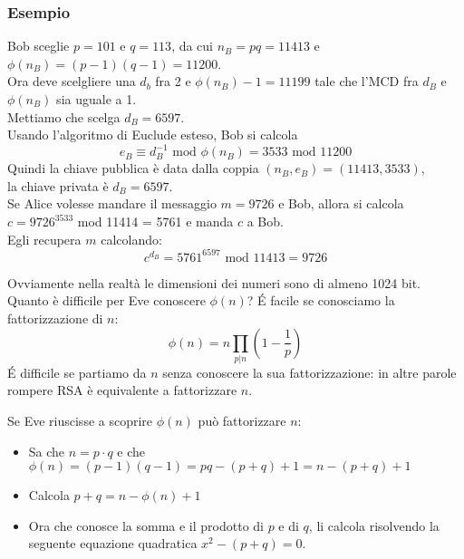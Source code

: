 \subsubsection*{Esempio}
Bob sceglie $p=101$ e $q=113$, da cui $n_B=pq=11413$ e $\phi(n_B) = (p-1)(q-1) = 11200$.\\
Ora deve scelgliere una $d_b$ fra 2 e $\phi(n_B) - 1 =11199$ tale che l'MCD fra $d_B$ e $\phi(n_B)$ sia uguale a 1.\\
Mettiamo che scelga $d_B=6597$.\\
Usando l'algoritmo di Euclude esteso, Bob si calcola
\begin{equation*}
	e_B \equiv d_B^{-1} \text{ mod } \phi(n_B) = 3533 \text { mod } 11200
\end{equation*}
Quindi la chiave pubblica è data dalla coppia $(n_B, e_B) = (11413, 3533)$,\\
la chiave privata è $d_B=6597$.\\

Se Alice volesse mandare il messaggio $m=9726$ e Bob, allora si calcola $c=9726^{3533}$ mod 11414 = 5761 e manda $c$ a Bob.\\
Egli recupera $m$ calcolando:
\begin{equation*}
	c^{d_B} = 5761^{6597} \text{ mod } 11413 = 9726
\end{equation*}

Ovviamente nella realtà le dimensioni dei numeri sono di almeno 1024 bit.\\


Quanto è difficile per Eve conoscere $\phi(n)$? \'E facile se conosciamo la fattorizzazione di $n$:
\begin{equation*}
	\phi(n) = n \prod_{p|n}(1 - \frac1p)
\end{equation*}
\'E difficile se partiamo da $n$ senza conoscere la sua fattorizzazione: in altre parole rompere RSA è equivalente a fattorizzare $n$.

Se Eve riuscisse a scoprire $\phi(n)$ può fattorizzare $n$:
\begin{itemize}
	\item Sa che $n=p\cdot q$ e che $\phi(n) = (p-1)(q-1) = pq - (p+q)+1=n-(p+q)+1$
	\item Calcola $p+q=n-\phi(n) + 1$
	\item Ora che conosce la somma e il prodotto di $p$ e di $q$, li calcola risolvendo la seguente equazione quadratica $x^2 -(p+q) = 0$.
\end{itemize}

